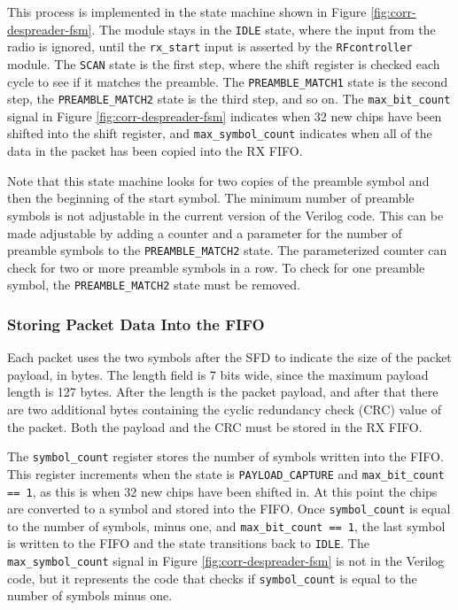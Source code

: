 This process is implemented in the state machine shown in Figure \ref{fig:corr-despreader-fsm}. The module stays in the \texttt{IDLE} state, where the input from the radio is ignored, until the \texttt{rx\_start} input is asserted by the \texttt{RFcontroller} module. The \texttt{SCAN} state is the first step, where the shift register is checked each cycle to see if it matches the preamble. The \texttt{PREAMBLE\_MATCH1} state is the second step, the \texttt{PREAMBLE\_MATCH2} state is the third step, and so on. The \texttt{max\_bit\_count} signal in Figure \ref{fig:corr-despreader-fsm} indicates when 32 new chips have been shifted into the shift register, and \texttt{max\_symbol\_count} indicates when all of the data in the packet has been copied into the RX FIFO.

Note that this state machine looks for two copies of the preamble symbol and then the beginning of the start symbol. The minimum number of preamble symbols is not adjustable in the current version of the Verilog code. This can be made adjustable by adding a counter and a parameter for the number of preamble symbols to the \texttt{PREAMBLE\_MATCH2} state. The parameterized counter can check for two or more preamble symbols in a row. To check for one preamble symbol, the \texttt{PREAMBLE\_MATCH2} state must be removed.

\subsubsection{Storing Packet Data Into the FIFO}
Each packet uses the two symbols after the SFD to indicate the size of the packet payload, in bytes. The length field is 7 bits wide, since the maximum payload length is 127 bytes. After the length is the packet payload, and after that there are two additional bytes containing the cyclic redundancy check (CRC) value of the packet. Both the payload and the CRC must be stored in the RX FIFO.

The \texttt{symbol\_count} register stores the number of symbols written into the FIFO. This register increments when the state is \texttt{PAYLOAD\_CAPTURE} and \texttt{max\_bit\_count == 1}, as this is when 32 new chips have been shifted in. At this point the chips are converted to a symbol and stored into the FIFO.  Once \texttt{symbol\_count} is equal to the number of symbols, minus one, and \texttt{max\_bit\_count == 1}, the last symbol is written to the FIFO and the state transitions back to \texttt{IDLE}. The \texttt{max\_symbol\_count} signal in Figure \ref{fig:corr-despreader-fsm} is not in the Verilog code, but it represents the code that checks if \texttt{symbol\_count} is equal to the number of symbols minus one.

